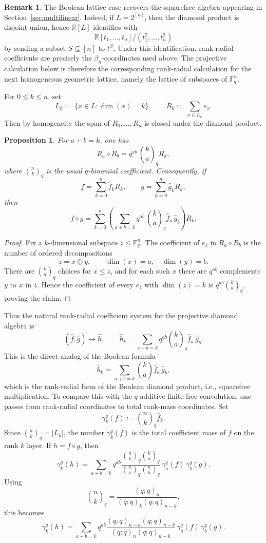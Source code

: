 \documentclass[11pt]{amsart}
\newtheorem{prop}[thm]{Proposition}
\theoremstyle{definition}
\newtheorem{remark}[thm]{Remark}
\newcommand{\bn}[2]{{\textstyle\binom{#1}{#2}}}
\begin{document}
\begin{remark}
The Boolean lattice case recovers the squarefree algebra appearing in Section~\ref{sec:multilinear}.  Indeed, if \(L=2^{[n]}\), then the diamond product is disjoint union, hence $\mathbb R[L]$ identifies with
\[
    \mathbb R[t_1,\dotsc,t_n]/(t_1^2,\dotsc,t_n^2)
\]
by sending a subset $S\subseteq[n]$ to \(t^S\).  Under this identification, rank-radial coefficients are precisely the \(\beta_n\)-coordinates used above.
The projective calculation below is therefore the corresponding rank-radial calculation for the next homogeneous geometric lattice, namely the lattice of subspaces of \(\mathbb F_q^n\).
\end{remark}

For $0\leq k\leq n$, set
\[
    L_k:=\{x\in L: \dim(x)=k\},
    \qquad
    R_k:=\sum_{x\in L_k}e_x.
\]
Then by homogeneity the span of $R_0,\dotsc,R_n$ is closed under the diamond product.

\begin{prop}\label{prop:projective-radial-diamond}
For \(a+b=k\), one has
\[
    R_a\diamond R_b
    =
    q^{ab}\,\binom{k}{a}_q R_k,
\]
where $\bn{n}{k}_q$ is the usual $q$-binomial coefficient.
Consequently, if
\[
    f=\sum_{k=0}^n \widehat f_k R_k,
    \qquad
    g=\sum_{k=0}^n \widehat g_k R_k,
\]
then
\[
    f\diamond g =
    \sum_{k=0}^n
    \left(
        \sum_{a+b=k}
        q^{ab}\,\binom{k}{a}_q
        \widehat f_a\,\widehat g_b
    \right)R_k.
\]
\end{prop}

\begin{proof}
Fix a $k$-dimensional subspace $z\leq \mathbb F_q^n$.  The coefficient of $e_z$ in $R_a\diamond R_b$ is the number of ordered decompositions
\[
    z=x\oplus y,\qquad \dim(x)=a,\quad \dim(y)=b.
\]
There are $\bn{k}{a}_q$ choices for $x\leq z$, and for each such $x$ there are $q^{ab}$ complements $y$ to $x$ in $z$. Hence the coefficient of every $e_z$ with $\dim(z)=k$ is $q^{ab}\binom{k}{a}_q$, proving the claim.
\end{proof}

Thus the natural rank-radial coefficient system for the projective diamond algebra is 
\[ 
    (\widehat f,\widehat g) \longmapsto \widehat h, \qquad \widehat h_k = \sum_{a+b=k} q^{ab}\binom{k}{a}_q \widehat f_a\,\widehat g_b. 
\] 
This is the direct analog of the Boolean formula 
\[ 
    \widehat h_k = \sum_{a+b=k} \binom{k}{a} \widehat f_a\,\widehat g_b,
\] 
which is the rank-radial form of the Boolean diamond product, i.e., squarefree multiplication. To compare this with the $q$-additive finite free convolution, one passes from rank-radial coordinates to total rank-mass coordinates. Set
\[ 
    \gamma^q_k(f):=\binom{n}{k}_q \widehat f_k. 
\] 
Since $\binom{n}{k}_q=|L_k|$, the number $\gamma^q_k(f)$ is the total coefficient mass of $f$ on the rank $k$ layer. If \(h=f\diamond g\), then 
\[ 
    \gamma_k^q(h) = \sum_{a+b=k} q^{ab} \frac{ \binom{n}{k}_q\binom{k}{a}_q }{ \binom{n}{a}_q\binom{n}{b}_q }\, \gamma^q_a(f)\,\gamma^q_b(g). 
\] 
Using 
\[ 
    \bn{n}{k}_q = \frac{(q;q)_n}{(q;q)_k(q;q)_{n-k}}, 
\] 
this becomes 
\[ 
    \gamma_k^q(h) = \sum_{a+b=k} q^{ab} \frac{ (q;q)_{n-a}(q;q)_{n-b} }{ (q;q)_n(q;q)_{n-k} }\, \gamma^q_a(f)\, \gamma^q_b(g). 
\] 
\end{document}
